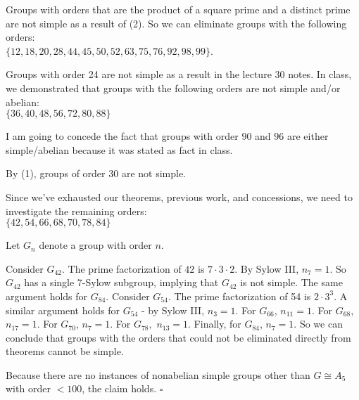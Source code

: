 \documentclass[11pt]{article}
\begin{document}
\begin{enumerate}
    Groups with orders that are the product of a square prime and a distinct prime are not simple as a result of (2). So we can eliminate groups with the following orders:\\ 
    $\{12, 18, 20, 28, 44, 45, 50, 52, 63, 75, 76, 92, 98, 99\}$.
    
    Groups with order 24 are not simple as a result in the lecture 30 notes. In class, we demonstrated that groups with the following orders are not simple and/or abelian:\\
    $\{36, 40, 48, 56, 72, 80, 88\}$

    I am going to concede the fact that groups with order $90$ and $96$ are either simple/abelian because it was stated as fact in class. 

    By (1), groups of order 30 are not simple.
    
    Since we've exhausted our theorems, previous work, and concessions, we need to investigate the remaining orders:\\ $\{42, 54, 66, 68, 70, 78, 84\}$

    Let $G_n$ denote a group with order $n$. 
    
    Consider $G_{42}$. The prime factorization of $42$ is $7 \cdot 3 \cdot 2$. By Sylow III, $n_{7} = 1$. So $G_{42}$ has a single 7-Sylow subgroup, implying that $G_{42}$ is not simple. The same argument holds for $G_{84}$. Consider $G_{54}$. The prime factorization of 54 is $2 \cdot 3^3$. A similar argument holds for $G_{54}$ - by Sylow III, $n_3 = 1$. For $G_{66}$, $n_{11} = 1$. For $G_{68}$, $n_{17} = 1$. For $G_{70}$, $n_7 = 1$. For $G_{78},$ $n_{13} = 1$. Finally, for $G_{84}$, $n_7 = 1$. So we can conclude that groups with the orders that could not be eliminated directly from theorems cannot be simple.
    
    Because there are no instances of nonabelian simple groups other than $G \cong A_5$ with order $< 100$, the claim holds. $\square$
    
\end{enumerate}
\end{document}
